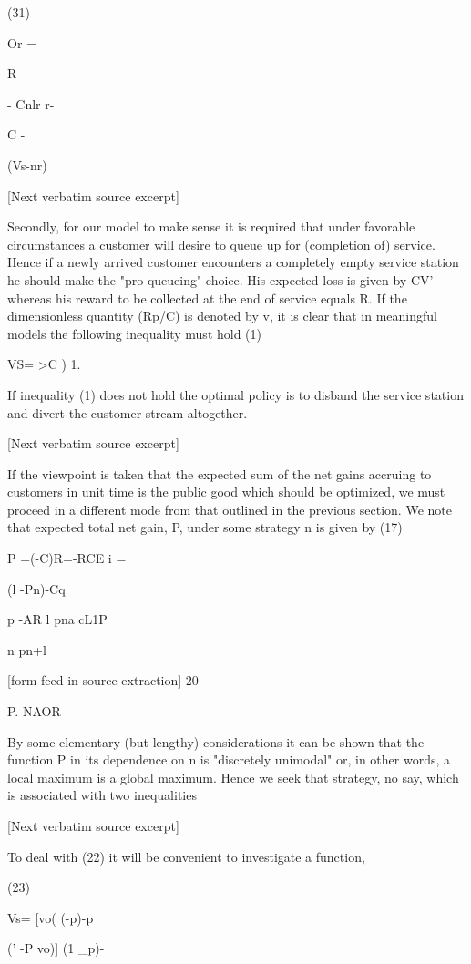 \documentclass[10pt]{article}
\begin{document}
\begin{ReviewVerbatim}

(31)

Or =

R

- Cnlr
r-

C
-

(Vs-nr)

[Next verbatim source excerpt]

Secondly, for our model to make sense it is required that under favorable circumstances a customer will desire to queue up for (completion of) service. Hence if a
newly arrived customer encounters a completely empty service station he should
make the "pro-queueing" choice. His expected loss is given by CV' whereas his
reward to be collected at the end of service equals R. If the dimensionless quantity
(Rp/C) is denoted by v, it is clear that in meaningful models the following inequality
must hold
(1)

VS= >C ) 1.

If inequality (1) does not hold the optimal policy is to disband the service station
and divert the customer stream altogether.

[Next verbatim source excerpt]

If the viewpoint is taken that the expected sum of the net gains accruing to
customers in unit time is the public good which should be optimized, we must
proceed in a different mode from that outlined in the previous section. We note
that expected total net gain, P, under some strategy n is given by
(17)

P =(-C)R=-RCE {i} =

(l -Pn)-Cq

p
-AR l
pna cL1P

n pn+l


[form-feed in source extraction]
20

P. NAOR

By some elementary (but lengthy) considerations it can be shown that the
function P in its dependence on n is "discretely unimodal" or, in other words, a
local maximum is a global maximum. Hence we seek that strategy, no say, which is
associated with two inequalities

[Next verbatim source excerpt]

To deal with (22) it will be convenient to investigate a function,

(23)

Vs= [vo( (-p)-p

(' -P vo)] (1 _p)-


\end{ReviewVerbatim}
\end{document}
